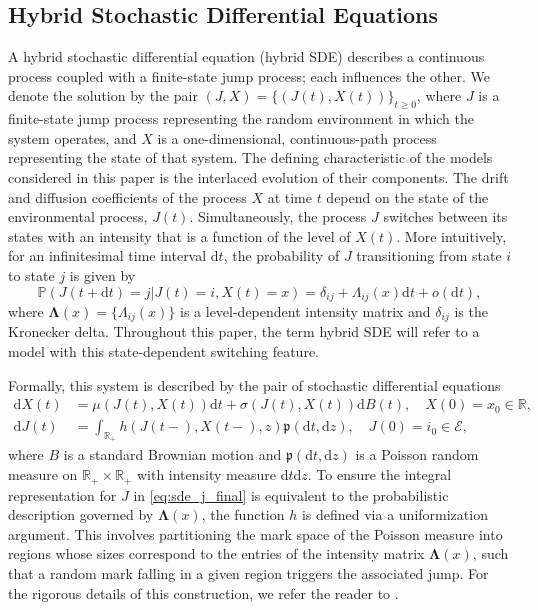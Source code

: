 \documentclass[11pt]{article}
\numberwithin{table}{section}
\numberwithin{figure}{section}
\numberwithin{equation}{section}
\newcommand{\dd}{\mathrm{d}}
\newcommand{\1}{{\mathbf 1}}
\newcommand{\0}{\mat{0}}
\begin{document}
\subsection{Hybrid Stochastic Differential Equations}
A hybrid stochastic differential equation (hybrid SDE) describes a continuous process coupled with a finite-state jump process; each influences the other. We denote the solution by the pair \( (J,X)=\{(J(t),X(t))\}_{t\ge0} \), where \(J\) is a finite-state jump process representing the random environment in which the system operates, and \(X\) is a one-dimensional, continuous-path process representing the state of that system. The defining characteristic of the models considered in this paper is the interlaced evolution of their components. The drift and diffusion coefficients of the process \(X\) at time \(t\) depend on the state of the environmental process, \(J(t)\). Simultaneously, the process \(J\) switches between its states with an intensity that is a function of the level of \(X(t)\). More intuitively, for an infinitesimal time interval \(\dd t\), the probability of \(J\) transitioning from state \(i\) to state \(j\) is given by
\[
\mathbb{P}(J(t+\dd t)=j | J(t)=i, X(t)=x) = \delta_{ij} + \Lambda_{ij}(x)\dd t + o(\dd t),
\]
where \(\bm{\Lambda}(x)=\{\Lambda_{ij}(x)\}\) is a level-dependent intensity matrix and \(\delta_{ij}\) is the Kronecker delta. Throughout this paper, the term hybrid SDE will refer to a model with this state-dependent switching feature.

Formally, this system is described by the pair of stochastic differential equations
\begin{align}
\dd X(t) &= \mu(J(t), X(t)) \dd t + \sigma(J(t), X(t)) \dd B(t), \quad X(0) = x_0 \in \mathbb{R}, \label{eq:sde_x_final} \\
\dd J(t) &= \int_{\mathbb{R}_+} h(J(t-), X(t-), z) \mathfrak{p}(\dd t, \dd z), \quad J(0) = i_0 \in \mathcal{E}, \label{eq:sde_j_final}
\end{align}
where \(B\) is a standard Brownian motion and \(\mathfrak{p}(\dd t, \dd z)\) is a Poisson random measure on \(\mathbb{R}_+ \times \mathbb{R}_+\) with intensity measure \(\dd t \dd z\). To ensure the integral representation for \(J\) in \eqref{eq:sde_j_final} is equivalent to the probabilistic description governed by \(\bm{\Lambda}(x)\), the function \(h\) is defined via a uniformization argument. This involves partitioning the mark space of the Poisson measure into regions whose sizes correspond to the entries of the intensity matrix \(\bm{\Lambda}(x)\), such that a random mark falling in a given region triggers the associated jump. For the rigorous details of this construction, we refer the reader to \cite{albrecher2022space}.
\end{document}
